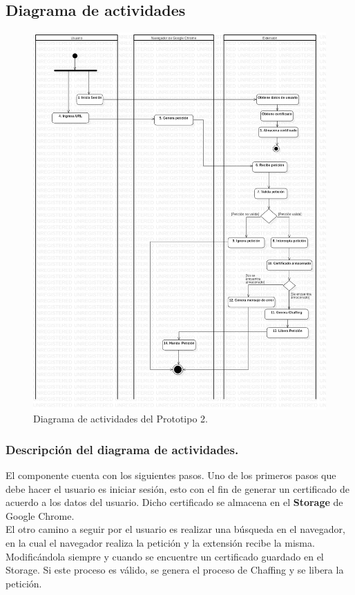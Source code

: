 \documentclass[12pt, a4paper, titlepage]{report}
\begin{document}
		    \subsection{Diagrama de actividades}
    		    \begin{figure}[H]
    				\begin{center}	\includegraphics[width=13cm]{./imagenes/Disenio/Componente_1/CI_DA.png}
    					\caption{Diagrama de actividades del Prototipo 2.}
    				\end{center}
    			\end{figure}
    		
        		\subsubsection{Descripción del diagrama de actividades.}
        		El componente cuenta con los siguientes pasos.
            	Uno de los primeros pasos que debe hacer el usuario es iniciar sesión, esto con el fin de generar un certificado de acuerdo a los datos del usuario. Dicho certificado se almacena en el \textbf{Storage} de Google Chrome. \\
            	El otro camino a seguir por el usuario es realizar una búsqueda en el navegador, en la cual el navegador realiza la petición y la extensión recibe la misma. Modificándola siempre y cuando se encuentre un certificado guardado en el Storage. Si este proceso es válido, se genera el proceso de Chaffing y se libera la petición.
			
\end{document}
